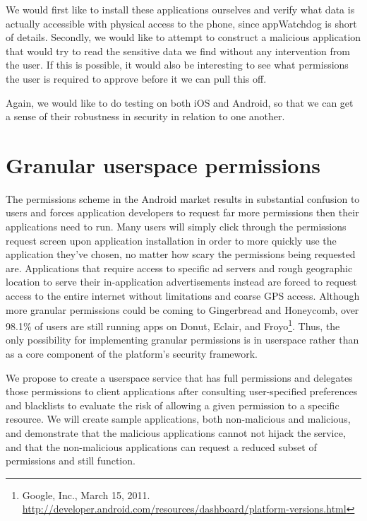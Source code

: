 \documentclass[11pt]{article}
\begin{document}
We would first like to install these applications ourselves and verify what
data is actually accessible with physical access to the phone, since
appWatchdog is short of details. Secondly, we would like to attempt to
construct a malicious application that would try to read the sensitive data we
find without any intervention from the user. If this is possible, it would also
be interesting to see what permissions the user is required to approve before
it we can pull this off.

Again, we would like to do testing on both iOS and Android, so that we can get
a sense of their robustness in security in relation to one another.

\section{Granular userspace permissions}
The permissions scheme in the Android market results in substantial confusion
to users and forces application developers to request far more permissions
then their applications need to run. Many users will simply click through the
permissions request screen upon application installation in order to more
quickly use the application they've chosen, no matter how scary the
permissions being requested are. Applications that require access to specific
ad servers and rough geographic location to serve their in-application
advertisements instead are forced to request access to the entire internet
without limitations and coarse GPS access. Although more granular permissions
could be coming to Gingerbread and Honeycomb, over 98.1\% of users are still
running apps on Donut, Eclair, and Froyo\footnote{Google, Inc., March 15, 2011.
\url{http://developer.android.com/resources/dashboard/platform-versions.html}}.
Thus, the only possibility for implementing granular permissions is in
userspace rather than as a core component of the platform's security framework.

We propose to create a userspace service that has full permissions and
delegates those permissions to client applications after consulting
user-specified preferences and blacklists to evaluate the risk of allowing a
given permission to a specific resource. We will create sample applications,
both non-malicious and malicious, and demonstrate that the malicious
applications cannot not hijack the service, and that the non-malicious
applications can request a reduced subset of permissions and still function.
\end{document}
